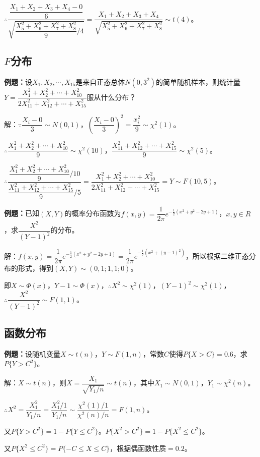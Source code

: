 $\therefore\dfrac{\dfrac{X_1+X_2+X_3+X_4-0}{6}}{\sqrt{\dfrac{X_5^2+X_6^2+X_7^2+X_8^2}{9}/4}}=\dfrac{X_1+X_2+X_3+X_4}{\sqrt{X_5^2+X_6^2+X_7^2+X_8^2}}\sim t(4)$。

\subsection{\texorpdfstring{$F$分布}{}}

\textbf{例题：}设$X_1,X_2,\cdots,X_15$是来自正态总体$N(0,3^2)$的简单随机样本，则统计量$Y=\dfrac{X_1^2+X_2^2+\cdots+X_{10}^2}{2X_{11}^2+X_{12}^2+\cdots+X_{15}^2}$服从什么分布？

解：$\because\dfrac{X_i-0}{3}\sim N(0,1)$，$\left(\dfrac{X_i-0}{3}\right)^2=\dfrac{x_i^2}{9}\sim\chi^2(1)$。

$\therefore\dfrac{X_1^2+X_2^2+\cdots+X_{10}^2}{9}\sim\chi^2(10)$，$\dfrac{X_{11}^2+X_{12}^2+\cdots+X_{15}^2}{9}\sim\chi^2(5)$。

$\therefore\dfrac{\dfrac{X_1^2+X_2^2+\cdots+X_{10}^2}{9}/10}{\dfrac{X_{11}^2+X_{12}^2+\cdots+X_{15}^2}{9}/5}=\dfrac{X_1^2+X_2^2+\cdots+X_{10}^2}{2X_{11}^2+X_{12}^2+\cdots+X_{15}^2}=Y\sim F(10,5)$。

\textbf{例题：}已知$(X,Y)$的概率分布函数为$f(x,y)=\dfrac{1}{2\pi}e^{-\frac{1}{2}(x^2+y^2-2y+1)}$，$x,y\in R$，求$\dfrac{X^2}{(Y-1)^2}$的分布。

解：$f(x,y)=\dfrac{1}{2\pi}e^{-\frac{1}{2}(x^2+y^2-2y+1)}=\dfrac{1}{2\pi}e^{-\frac{1}{2}(x^2+(y-1)^2)}$，所以根据二维正态分布的形式，得到$(X,Y)\sim(0,1;1,1;0)$。

即$X\sim\varPhi(x)$，$Y-1\sim\varPhi(x)$，$\therefore X^2\sim\chi^2(1)$，$(Y-1)^2\sim\chi^2(1)$，$\therefore\dfrac{X^2}{(Y-1)^2}\sim F(1,1)$。

\subsection{函数分布}

\textbf{例题：}设随机变量$X\sim t(n)$，$Y\sim F(1,n)$，常数$C$使得$P\{X>C\}=0.6$，求$P\{Y>C^2\}$。

解：$X\sim t(n)$，则$X=\dfrac{X_1}{\sqrt{Y_1/n}}\sim t(n)$，其中$X_1\sim N(0,1)$，$Y_1\sim\chi^2(n)$。

$\therefore X^2=\dfrac{X_1^2}{Y_1/n}=\dfrac{X_1^2/1}{Y_1/n}\sim\dfrac{\chi^2(1)/1}{\chi^2(n)/n}=F(1,n)$。

又$P\{Y>C^2\}=1-P\{Y\leqslant C^2\}$。$P\{X^2>C^2\}=1-P\{X^2\leqslant C^2\}$。

又$P\{X^2\leqslant C^2\}=P\{-C\leqslant X\leqslant C\}$，根据偶函数性质$=0.2$。

